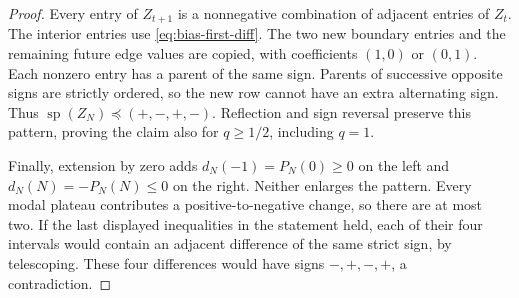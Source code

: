 \begin{proof}
Every entry of $Z_{t+1}$ is a nonnegative combination of adjacent entries
of $Z_t$. The interior entries use \eqref{eq:bias-first-diff}. The two new
boundary entries and the remaining future edge values are copied,
with coefficients $(1,0)$ or $(0,1)$. Each nonzero entry has a parent
of the same sign. Parents of successive opposite signs are strictly
ordered, so the new row cannot have an extra alternating sign.
Thus $\operatorname{sp}(Z_N)\preceq(+,-,+,-)$. Reflection and sign
reversal preserve this pattern, proving the claim also for $q\ge1/2$,
including $q=1$.

Finally, extension by zero adds $d_N(-1)=P_N(0)\ge0$ on the left and $d_N(N)=-P_N(N)\le0$ on the right. Neither enlarges the pattern.
Every modal plateau contributes a positive-to-negative change, so there
are at most two. If the last displayed inequalities in the statement
held, each of their four intervals would contain an adjacent difference
of the same strict sign, by telescoping. These four differences would
have signs $-,+,-,+$, a contradiction.
\end{proof}


